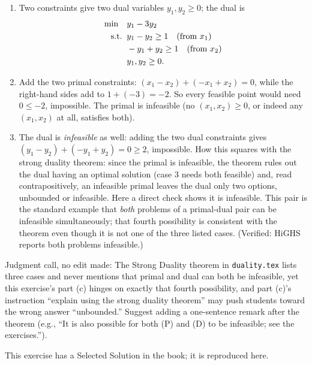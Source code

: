 \begin{enumerate}
\item Two constraints give two dual variables $y_1, y_2 \ge 0$; the dual is
\[
\begin{aligned}
\min \quad & y_1 - 3y_2 \\
\text{s.t.}\;\; & y_1 - y_2 \ge 1 \quad \text{(from } x_1\text{)} \\
& -y_1 + y_2 \ge 1 \quad \text{(from } x_2\text{)} \\
& y_1, y_2 \ge 0 .
\end{aligned}
\]
\item Add the two primal constraints: $(x_1 - x_2) + (-x_1 + x_2) = 0$, while the right-hand sides add to $1 + (-3) = -2$. So every feasible point would need $0 \le -2$, impossible. The primal is infeasible (no $(x_1, x_2) \ge 0$, or indeed any $(x_1, x_2)$ at all, satisfies both).
\item The dual is \emph{infeasible} as well: adding the two dual constraints gives $(y_1 - y_2) + (-y_1 + y_2) = 0 \ge 2$, impossible. How this squares with the strong duality theorem: since the primal is infeasible, the theorem rules out the dual having an optimal solution (case 3 needs both feasible) and, read contrapositively, an infeasible primal leaves the dual only two options, unbounded or infeasible. Here a direct check shows it is infeasible. This pair is the standard example that \emph{both} problems of a primal-dual pair can be infeasible simultaneously; that fourth possibility is consistent with the theorem even though it is not one of the three listed cases. (Verified: HiGHS reports both problems infeasible.)
\end{enumerate}

\begin{qaflag}
Judgment call, no edit made: The Strong Duality theorem in \texttt{duality.tex} lists three cases and never mentions that primal and dual can both be infeasible, yet this exercise's part (c) hinges on exactly that fourth possibility, and part (c)'s instruction ``explain using the strong duality theorem'' may push students toward the wrong answer ``unbounded.'' Suggest adding a one-sentence remark after the theorem (e.g., ``It is also possible for both (P) and (D) to be infeasible; see the exercises.'').
\end{qaflag}


This exercise has a Selected Solution in the book; it is reproduced here.

